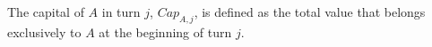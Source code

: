 {}
\begin{definition}[Capital]
  The capital of $A$ in turn $j$, $Cap_{A, j}$, is defined as the total value that belongs exclusively to $A$ at the
  beginning of turn $j$.
\end{definition}

